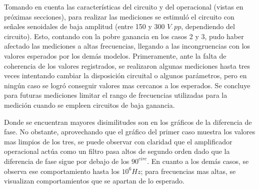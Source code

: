 Tomando en cuenta las características del circuito y del operacional (vistas en próximas secciones), para realizar las mediciones se estimuló el circuito con señales senoidales de baja amplitud (entre 150 y 300 $V_¨{pp}$, dependiendo del circuito). Esto, contando con la pobre ganancia en los casos 2 y 3, pudo haber afectado las mediciones a altas frecuencias, llegando a las incongruencias con los valores esperados por los demás modelos. Primeramente, ante la falta de coherencia de los valores registrados, se realizaron algunas mediciones hasta tres veces intentando cambiar la disposición circuital o algunos parámetros, pero en ningún caso se logró conseguir valores mas cercanos a los esperados. Se concluye para futuras mediciones limitar el rango de frecuencias utilizadas para la medición cuando se empleen circuitos de baja ganancia.   

Donde se encuentran mayores disimilitudes son en los gráficos de la diferencia de fase. No obstante, aprovechando que el gráfico del primer caso muestra los valores mas limpios de los tres, se puede observar con claridad que el amplificador operacional actúa como un filtro pasa altos de segundo orden dado que la diferencia de fase sigue por debajo de los $90^{circ}$. En cuanto a los demás casos, se observa ese comportamiento hasta los $10^{6} Hz$; para frecuencias mas altas, se visualizan comportamientos que se apartan de lo esperado. 






